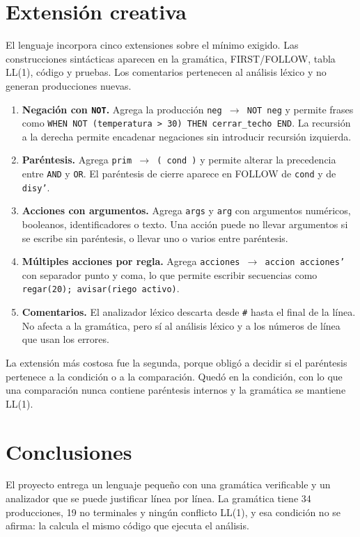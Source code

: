 \documentclass[11pt,letterpaper]{article}
\newcommand{\code}[1]{\texttt{#1}}
\newcommand{\dq}{\textquotedbl{}}
\begin{document}
\section{Extensión creativa}

El lenguaje incorpora cinco extensiones sobre el mínimo exigido. Las construcciones sintácticas aparecen en la gramática, FIRST/FOLLOW, tabla LL(1), código y pruebas. Los comentarios pertenecen al análisis léxico y no generan producciones nuevas.

\begin{enumerate}[leftmargin=1.4em]
\item \textbf{Negación con \code{NOT}.} Agrega la producción \code{neg $\rightarrow$ NOT neg} y permite frases como \code{WHEN NOT (temperatura > 30) THEN cerrar\_techo END}. La recursión a la derecha permite encadenar negaciones sin introducir recursión izquierda.
\item \textbf{Paréntesis.} Agrega \code{prim $\rightarrow$ ( cond )} y permite alterar la precedencia entre \code{AND} y \code{OR}. El paréntesis de cierre aparece en FOLLOW de \code{cond} y de \code{disy'}.
\item \textbf{Acciones con argumentos.} Agrega \code{args} y \code{arg} con argumentos numéricos, booleanos, identificadores o texto. Una acción puede no llevar argumentos si se escribe sin paréntesis, o llevar uno o varios entre paréntesis.
\item \textbf{Múltiples acciones por regla.} Agrega \code{acciones $\rightarrow$ accion acciones'} con separador punto y coma, lo que permite escribir secuencias como \code{regar(20); avisar(\dq riego activo\dq)}.
\item \textbf{Comentarios.} El analizador léxico descarta desde \code{\#} hasta el final de la línea. No afecta a la gramática, pero sí al análisis léxico y a los números de línea que usan los errores.
\end{enumerate}

La extensión más costosa fue la segunda, porque obligó a decidir si el paréntesis pertenece a la condición o a la comparación. Quedó en la condición, con lo que una comparación nunca contiene paréntesis internos y la gramática se mantiene LL(1).

\section{Conclusiones}

El proyecto entrega un lenguaje pequeño con una gramática verificable y un analizador que se puede justificar línea por línea. La gramática tiene 34 producciones, 19 no terminales y ningún conflicto LL(1), y esa condición no se afirma: la calcula el mismo código que ejecuta el análisis.
\end{document}
